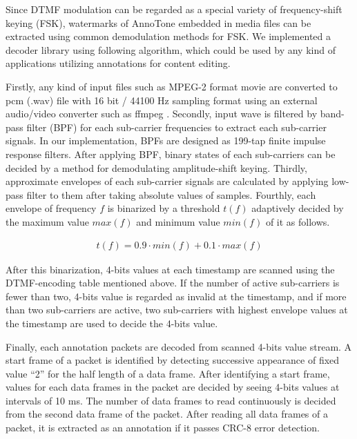 Since DTMF modulation can be regarded as a special variety of frequency-shift keying (FSK), watermarks of AnnoTone embedded in media files can be extracted using common demodulation methods for FSK.
We implemented a decoder library using following algorithm, which could be used by any kind of applications utilizing annotations for content editing.

Firstly, any kind of input files such as MPEG-2 format movie are converted to pcm (.wav) file with 16 bit / 44100 Hz sampling format using an external audio/video converter such as ffmpeg \cite{ffmpeg}.
Secondly, input wave is filtered by band-pass filter (BPF) for each sub-carrier frequencies to extract each sub-carrier signals.
In our implementation, BPFs are designed as 199-tap finite impulse response filters.
After applying BPF, binary states of each sub-carriers can be decided by a method for demodulating amplitude-shift keying.
Thirdly, approximate envelopes of each sub-carrier signals are calculated by applying low-pass filter to them after taking absolute values of samples.
Fourthly, each envelope of frequency $f$ is binarized by a threshold $t(f)$ adaptively decided by the maximum value $max(f)$ and minimum value $min(f)$ of it as follows.

\begin{align}
t(f) = 0.9 \cdot min(f) + 0.1 \cdot max(f)
\end{align}

After this binarization, 4-bits values at each timestamp are scanned using the DTMF-encoding table mentioned above.
If the number of active sub-carriers is fewer than two, 4-bits value is regarded as invalid  at the timestamp, and if more than two sub-carriers are active, two sub-carriers with highest envelope values at the timestamp are used to decide the 4-bits value.

Finally, each annotation packets are decoded from scanned 4-bits value stream.
A start frame of a packet is identified by detecting successive appearance of fixed value ``2'' for the half length of a data frame.
After identifying a start frame, values for each data frames in the packet are decided by seeing 4-bits values at intervals of 10 ms.
The number of data frames to read continuously is decided from the second data frame of the packet.
After reading all data frames of a packet, it is extracted as an annotation if it passes CRC-8 error detection.